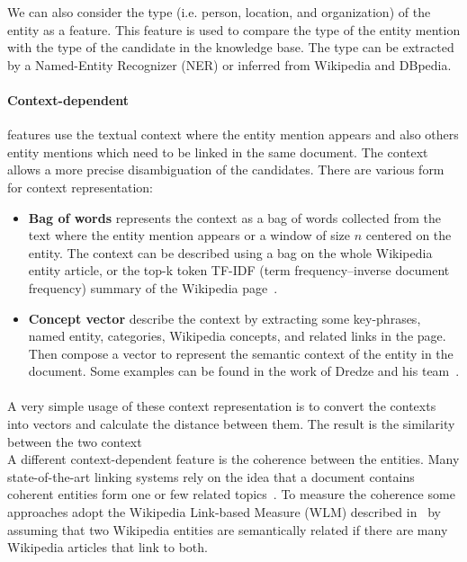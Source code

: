 We can also consider the type (i.e. person, location, and organization) of the entity as a feature. This feature is used to compare the type of the entity mention with the type of the candidate in the knowledge base. The type can be extracted by a Named-Entity Recognizer (NER) or inferred from Wikipedia and DBpedia.

\paragraph{Context-dependent} features use the textual context where the entity mention appears and also others entity mentions which need to be linked in the same document. The context allows a more precise disambiguation of the candidates. There are various form for context representation:

\begin{itemize}[topsep=10pt]
\item \textbf{Bag of words} represents the context as a bag of words collected from the text where the entity mention appears or a window of size $n$ centered on the entity. The context can be described using a bag on the whole Wikipedia entity article, or the top-k token TF-IDF (term frequency–inverse document frequency) summary of the Wikipedia page~\cite{ratinov2011local}.  

\item \textbf{Concept vector} describe the context by extracting some key-phrases, named entity, categories, Wikipedia concepts, and related links in the page. Then compose a vector to represent the semantic context of the entity in the document. Some examples can be found in the work of Dredze and his team~\cite{dredze2010entity}.
\end{itemize}

\paragraph{} A very simple usage of these context representation is to convert the contexts into vectors and calculate the distance between them. The result is the similarity between the two context\\
\- \- \- A different context-dependent feature is the coherence between the entities. Many state-of-the-art linking systems rely on the idea that a document contains coherent entities form one or few related topics~\cite{hoffart2011robust}. To measure the coherence some approaches adopt the Wikipedia Link-based Measure (WLM) described in~\cite{milne2008learning} by assuming that two Wikipedia entities are semantically related if there are many Wikipedia articles that link to both.

